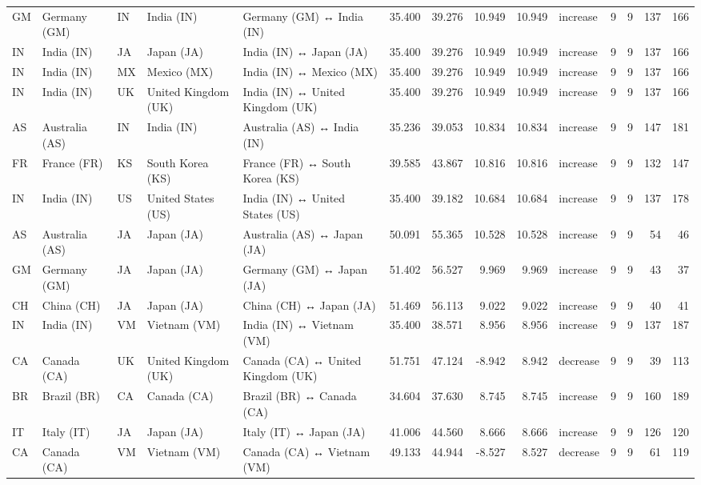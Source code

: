 \begin{tabular}{lllllrrrrlrrrr}
GM & Germany (GM) & IN & India (IN) & Germany (GM) ↔ India (IN) & 35.400 & 39.276 & 10.949 & 10.949 & increase & 9 & 9 & 137 & 166 \\
IN & India (IN) & JA & Japan (JA) & India (IN) ↔ Japan (JA) & 35.400 & 39.276 & 10.949 & 10.949 & increase & 9 & 9 & 137 & 166 \\
IN & India (IN) & MX & Mexico (MX) & India (IN) ↔ Mexico (MX) & 35.400 & 39.276 & 10.949 & 10.949 & increase & 9 & 9 & 137 & 166 \\
IN & India (IN) & UK & United Kingdom (UK) & India (IN) ↔ United Kingdom (UK) & 35.400 & 39.276 & 10.949 & 10.949 & increase & 9 & 9 & 137 & 166 \\
AS & Australia (AS) & IN & India (IN) & Australia (AS) ↔ India (IN) & 35.236 & 39.053 & 10.834 & 10.834 & increase & 9 & 9 & 147 & 181 \\
FR & France (FR) & KS & South Korea (KS) & France (FR) ↔ South Korea (KS) & 39.585 & 43.867 & 10.816 & 10.816 & increase & 9 & 9 & 132 & 147 \\
IN & India (IN) & US & United States (US) & India (IN) ↔ United States (US) & 35.400 & 39.182 & 10.684 & 10.684 & increase & 9 & 9 & 137 & 178 \\
AS & Australia (AS) & JA & Japan (JA) & Australia (AS) ↔ Japan (JA) & 50.091 & 55.365 & 10.528 & 10.528 & increase & 9 & 9 & 54 & 46 \\
GM & Germany (GM) & JA & Japan (JA) & Germany (GM) ↔ Japan (JA) & 51.402 & 56.527 & 9.969 & 9.969 & increase & 9 & 9 & 43 & 37 \\
CH & China (CH) & JA & Japan (JA) & China (CH) ↔ Japan (JA) & 51.469 & 56.113 & 9.022 & 9.022 & increase & 9 & 9 & 40 & 41 \\
IN & India (IN) & VM & Vietnam (VM) & India (IN) ↔ Vietnam (VM) & 35.400 & 38.571 & 8.956 & 8.956 & increase & 9 & 9 & 137 & 187 \\
CA & Canada (CA) & UK & United Kingdom (UK) & Canada (CA) ↔ United Kingdom (UK) & 51.751 & 47.124 & -8.942 & 8.942 & decrease & 9 & 9 & 39 & 113 \\
BR & Brazil (BR) & CA & Canada (CA) & Brazil (BR) ↔ Canada (CA) & 34.604 & 37.630 & 8.745 & 8.745 & increase & 9 & 9 & 160 & 189 \\
IT & Italy (IT) & JA & Japan (JA) & Italy (IT) ↔ Japan (JA) & 41.006 & 44.560 & 8.666 & 8.666 & increase & 9 & 9 & 126 & 120 \\
CA & Canada (CA) & VM & Vietnam (VM) & Canada (CA) ↔ Vietnam (VM) & 49.133 & 44.944 & -8.527 & 8.527 & decrease & 9 & 9 & 61 & 119 \\

\end{tabular}
